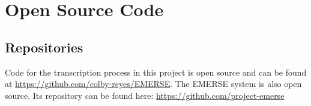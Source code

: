
\chapter{Open Source Code}



\section{Repositories}
\label{sec:code_appendix}
Code for the transcription process in this project is open source and can be found at \url{https://github.com/colby-reyes/EMERSE}.
The EMERSE system is also open source. Its repository can be found here: \url{https://github.com/project-emerse}


